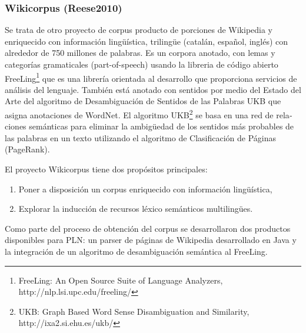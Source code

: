 \documentclass[letterpaper]{article}
\newcommand\textstylebibuscitbase[1]{#1}
\newcommand\liststyleLxvi{%
\renewcommand\theenumi{\arabic{enumi}}
\renewcommand\theenumii{\arabic{enumii}}
\renewcommand\theenumiii{\arabic{enumiii}}
\renewcommand\theenumiv{\arabic{enumiv}}
\renewcommand\labelenumi{\theenumi.}
\renewcommand\labelenumii{\theenumii.}
\renewcommand\labelenumiii{\theenumiii.}
\renewcommand\labelenumiv{\theenumiv.}
}
\begin{document}
\bigskip

\subsubsection[Wikicorpus (Reese2010)]{\textstylebibuscitbase{Wikicorpus
}\textstylebibuscitbase{(Reese2010)}}
\hypertarget{RefHeading10796782078703}{}
\bigskip

{\sffamily
\textstylebibuscitbase{Se trata de otro proyecto de corpus producto de
porciones de Wikipedia y enriquecido con informaci\'on ling\"u\'istica,
triling\"ue (catal\'an, espa\~nol, ingl\'es) con alrededor de 750
millones de palabras. Es un corpora anotado, con lemas y categor\'ias
gramaticales (part-of-speech) usando la libreria de c\'odigo abierto
FreeLing}\footnote{FreeLing: An Open Source Suite of Language
Analyzers, http://nlp.lsi.upc.edu/freeling/}\textstylebibuscitbase{ que
es una librer\'ia orientada al desarrollo que proporciona servicios de
an\'alisis del lenguaje. Tambi\'en est\'a anotado con sentidos por
medio del Estado del Arte del algoritmo de Desambiguaci\'on de Sentidos
de las Palabras UKB que asigna anotaciones de WordNet. El algoritmo
UKB}\footnote{\foreignlanguage{spanish}{\textrm{UKB: Graph Based Word
Sense Disambiguation and Similarity,
}}http://ixa2.si.ehu.es/ukb/}\textstylebibuscitbase{\foreignlanguage{spanish}{
se basa en una red de relaciones sem\'anticas para eliminar la
ambig\"uedad de los sentidos m\'as
}}\textstylebibuscitbase{\foreignlanguage{spanish}{probables de las
palabras en un texto utilizando el algoritmo de Clasificaci\'on de
P\'aginas (PageRank).}}}


\bigskip

{\sffamily
\textstylebibuscitbase{El proyecto Wikicorpus tiene dos prop\'ositos
principales:}}


\bigskip

\liststyleLxvi
\begin{enumerate}
\item {\sffamily
\textstylebibuscitbase{Poner a disposici\'on un corpus enriquecido con
informaci\'on ling\"u\'istica,}}
\item {\sffamily
\textstylebibuscitbase{Explorar la inducci\'on de recursos l\'exico
sem\'anticos multiling\"ues.}}
\end{enumerate}

\bigskip

{\sffamily
\textstylebibuscitbase{Como parte del proceso de obtenci\'on del corpus
se desarrollaron dos productos }\textstylebibuscitbase{disponibles para
PLN: un parser de p\'aginas de Wikipedia desarrollado en Java
}\textstylebibuscitbase{y la integraci\'on de un algoritmo de
desambiguaci\'on sem\'antica al FreeLing.}}
\end{document}
